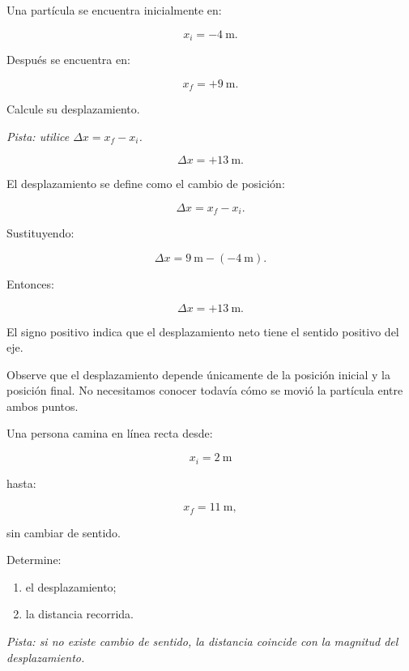 \begin{ejercicio}
Una partícula se encuentra inicialmente en:

\[ x_i=-\SI{4}{\meter}. \]

Después se encuentra en:

\[ x_f=+\SI{9}{\meter}. \]

Calcule su desplazamiento.

\textit{Pista: utilice \(\Delta x=x_f-x_i\).}
\end{ejercicio}

\begin{respuesta}
\[ \boxed{\Delta x=+\SI{13}{\meter}}. \]
\end{respuesta}

\begin{explicacion}
El desplazamiento se define como el cambio de posición:

\[ \Delta x=x_f-x_i. \]

Sustituyendo:

\[
\Delta x
=
\SI{9}{\meter}
-
(-\SI{4}{\meter}).
\]

Entonces:

\[ \boxed{\Delta x=+\SI{13}{\meter}}. \]

El signo positivo indica que el desplazamiento neto tiene el sentido positivo del eje.

Observe que el desplazamiento depende únicamente de la posición inicial y la posición final. No necesitamos conocer todavía cómo se movió la partícula entre ambos puntos.
\end{explicacion}


\begin{ejercicio}
Una persona camina en línea recta desde:

\[ x_i=\SI{2}{\meter} \]

hasta:

\[ x_f=\SI{11}{\meter}, \]

sin cambiar de sentido.

Determine:

\begin{enumerate}[label=\alph*)]
    \item el desplazamiento;
    \item la distancia recorrida.
\end{enumerate}

\textit{Pista: si no existe cambio de sentido, la distancia coincide con la magnitud del desplazamiento.}
\end{ejercicio}

